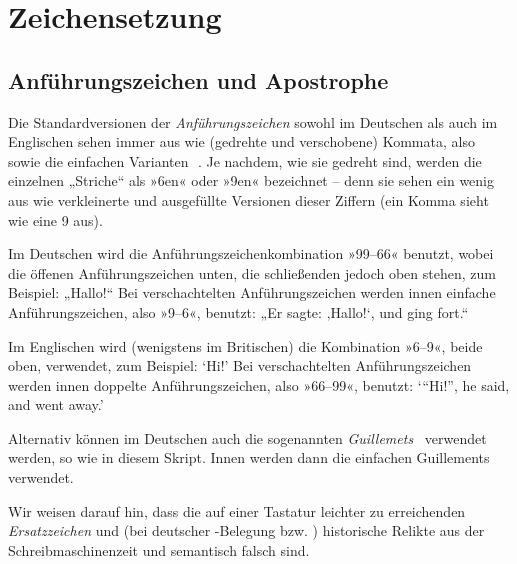 \chapter{Zeichensetzung}

\lipsum[1]

\section{Anführungszeichen und Apostrophe}

Die Standardversionen der \emph{Anführungszeichen} sowohl im Deutschen
als auch im Englischen sehen immer aus wie (gedrehte und verschobene)
Kommata, also \,\, sowie die einfachen
Varianten \,\,.  Je nachdem, wie sie gedreht
sind, werden die einzelnen „Striche“ als »6en« oder »9en« bezeichnet
-- denn sie sehen ein wenig aus wie verkleinerte und ausgefüllte
Versionen dieser Ziffern (ein Komma \Char{,} sieht wie eine 9 aus).

Im Deutschen wird die Anführungszeichenkombination »99–66« benutzt, wobei die
öffenen Anführungszeichen unten, die schließenden jedoch oben stehen, zum
Beispiel: „Hallo!“ Bei verschachtelten Anführungszeichen werden innen einfache
Anführungszeichen, also »9–6«, benutzt: „Er sagte: ‚Hallo!{‘}, und ging fort.“

Im Englischen wird (wenigstens im Britischen) die Kombination »6–9«,
beide oben, verwendet, zum Beispiel: \foreignlanguage{british}{‘Hi!’}
Bei verschachtelten Anführungszeichen werden innen doppelte
Anführungszeichen, also »66–99«, benutzt:
\foreignlanguage{british}{‘“Hi!”, he said, and went away.’}

Alternativ können im Deutschen auch die sogenannten \emph{Guillemets}
\, verwendet werden, so wie in diesem Skript.  Innen
werden dann die einfachen Guillements \, verwendet.

Wir weisen darauf hin, dass die auf einer Tastatur leichter zu
erreichenden \emph{Ersatzzeichen}  und \Char{\textquotesingle}
(bei deutscher -Belegung 
bzw. \keys{\shift+\#}) historische Relikte aus der
Schreibmaschinenzeit und semantisch falsch sind.

